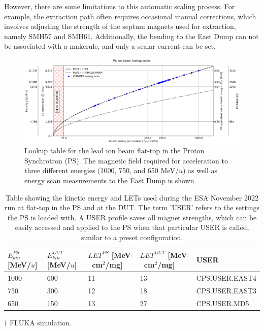 \documentclass{cernatsnote}
\begin{document}
However, there are some limitations to this automatic scaling process. For example, the extraction path often requires occasional manual corrections, which involves adjusting the strength of the septum magnets used for extraction, namely SMH57 and SMH61. Additionally, the bending to the East Dump can not be associated with a makerule, and only a scalar current can be set.
\\

\begin{figure}[!htb]
\centering
\includegraphics[width=1.0\textwidth]{images/PS_BEAM_ENERGY/kinetic_energy_lookup_chimera.png}
\caption{Lookup table for the lead ion beam flat-top in the Proton Synchrotron (PS). The magnetic field required for acceleration to three different energies (1000, 750, and 650 MeV/$u$) as well as energy scan measurements to the East Dump is shown.}
\label{fig:lookup table}
\end{figure}

\begin{table}[!htbp]
\centering
\caption{Table showing the kinetic energy and LETs used during the ESA November 2022 run at flat-top in the PS and at the DUT. The term 'USER' refers to the settings the PS is loaded with. A USER profile saves all magnet strengths, which can be easily accessed and applied to the PS when that particular USER is called, similar to a preset configuration.}
\begin{threeparttable}
\label{tab:KE_table}
\begin{tabular}{@{}m{1.6cm}m{1.6cm}m{2.8cm}m{2.8cm}m{4cm}@{}}
\toprule
$E^{PS}_{kin}$ {[}MeV/$u${]} & $E^{DUT}_{kin}$\tnote{$\dagger$} [MeV/$u$] & $LET^{PS}$\tnote{$\dagger$} [MeV$\cdot$~cm$^2$/mg] & $LET^{DUT}$\tnote{$\dagger$} [MeV$\cdot$~cm$^2$/mg] & USER \\ \midrule
1000 & 600 & 11 & 13 & CPS.USER.EAST4 \\
750 & 300 & 12 & 18 & CPS.USER.EAST3 \\
650 & 150 & 13 & 27 & CPS.USER.MD5 \\ \bottomrule
\end{tabular}
\begin{tablenotes}
\item[$\dagger$] FLUKA simulation.
\end{tablenotes}
\end{threeparttable}
\end{table}
\end{document}
